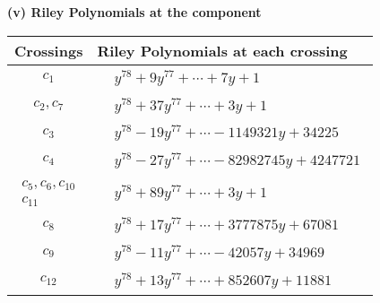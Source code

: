 \documentclass[1p]{elsarticle_modified}
\theoremstyle{definition}
\begin{document}
\newpage\renewcommand{\arraystretch}{1}
\flushleft \textbf{(v) Riley Polynomials at the component}\newline \\
\begin{tabular}{m{50pt}|m{274pt}}
Crossings & \hspace{64pt}Riley Polynomials at each crossing \\
\hline $$\begin{aligned}c_{1}\end{aligned}$$&$\begin{aligned}
&y^{78}+9 y^{77}+\cdots+7 y+1
\end{aligned}$\\
\hline $$\begin{aligned}c_{2},c_{7}\end{aligned}$$&$\begin{aligned}
&y^{78}+37 y^{77}+\cdots+3 y+1
\end{aligned}$\\
\hline $$\begin{aligned}c_{3}\end{aligned}$$&$\begin{aligned}
&y^{78}-19 y^{77}+\cdots-1149321 y+34225
\end{aligned}$\\
\hline $$\begin{aligned}c_{4}\end{aligned}$$&$\begin{aligned}
&y^{78}-27 y^{77}+\cdots-82982745 y+4247721
\end{aligned}$\\
\hline $$\begin{aligned}c_{5},c_{6},c_{10}\\c_{11}\end{aligned}$$&$\begin{aligned}
&y^{78}+89 y^{77}+\cdots+3 y+1
\end{aligned}$\\
\hline $$\begin{aligned}c_{8}\end{aligned}$$&$\begin{aligned}
&y^{78}+17 y^{77}+\cdots+3777875 y+67081
\end{aligned}$\\
\hline $$\begin{aligned}c_{9}\end{aligned}$$&$\begin{aligned}
&y^{78}-11 y^{77}+\cdots-42057 y+34969
\end{aligned}$\\
\hline $$\begin{aligned}c_{12}\end{aligned}$$&$\begin{aligned}
&y^{78}+13 y^{77}+\cdots+852607 y+11881
\end{aligned}$\\
\hline
\end{tabular}\\~\\
\end{document}
